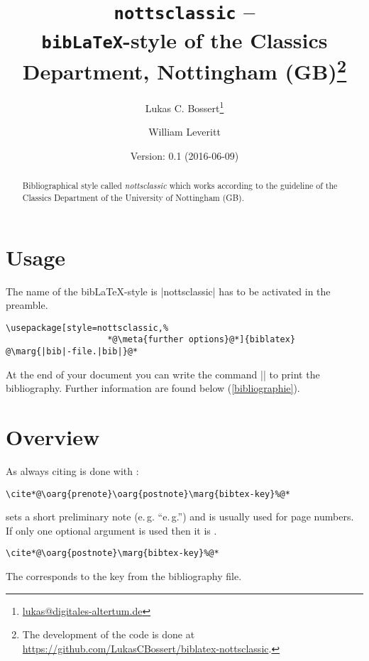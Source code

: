 \documentclass[a4paper,
10pt,
english
]{ltxdoc}
\begin{document}
\title{\texttt{nottsclassic} -- \\\texttt{bib\LaTeX}-style of the Classics Department, Nottingham (GB)\footnote{The development of the code is done at \url{https://github.com/LukasCBossert/biblatex-nottsclassic}.}}
\author{Lukas C. Bossert\thanks{\href{mailto:lukas@digitales-altertum.de}{lukas@digitales-altertum.de}} \and William Leveritt}
\date{Version: 0.1 (2016-06-09)}
 \maketitle
\begin{abstract}
Bibliographical style called \emph{nottsclassic} which works according to the guideline of the Classics Department of the University of Nottingham (GB).
 \end{abstract}




\section{Usage}
   The name of the bib\LaTeX-style is  |nottsclassic| has to be activated in the preamble. 

\begin{lstlisting}
\usepackage[style=nottsclassic,%
					*@\meta{further options}@*]{biblatex}
@\marg{|bib|-file.|bib|}@*
\end{lstlisting}


At the end of your document you can write the command |\printbibliography| to print 
the bibliography. 
Further information are found below   (\cref{bibliographie}).

\section{Overview}\label{overview}

\DescribeMacro{\cite}%
As always citing is done with :
\begin{lstlisting}
\cite*@\oarg{prenote}\oarg{postnote}\marg{bibtex-key}%@*
\end{lstlisting}

 sets a short preliminary note (e.\,g. \enquote{e.\,g.}) and  is usually used for page numbers.
If only one optional argument is used then it is .
\begin{lstlisting}
\cite*@\oarg{postnote}\marg{bibtex-key}%@*
\end{lstlisting}
The  corresponds to the key from the bibliography file.
\end{document}
